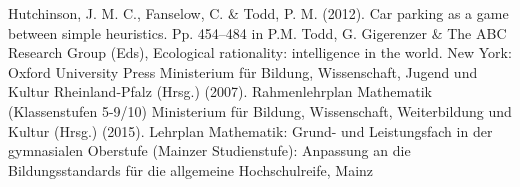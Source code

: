 \begin{thebibliography}{50}
	 Hutchinson, J. M. C., Fanselow, C. \& Todd, P. M. (2012). Car parking as a game between simple heuristics. Pp. 454–484 in P.M. Todd, G. Gigerenzer \& The ABC Research Group (Eds), Ecological rationality: intelligence in the world. New York: Oxford University Press
	 Ministerium für Bildung, Wissenschaft, Jugend und Kultur Rheinland-Pfalz (Hrsg.) (2007). Rahmenlehrplan Mathematik (Klassenstufen 5-9/10)
	 Ministerium für Bildung, Wissenschaft, Weiterbildung und Kultur (Hrsg.) (2015). Lehrplan Mathematik: Grund- und Leistungsfach in der gymnasialen Oberstufe (Mainzer Studienstufe): Anpassung an die Bildungsstandards für die allgemeine Hochschulreife, Mainz
\end{thebibliography}